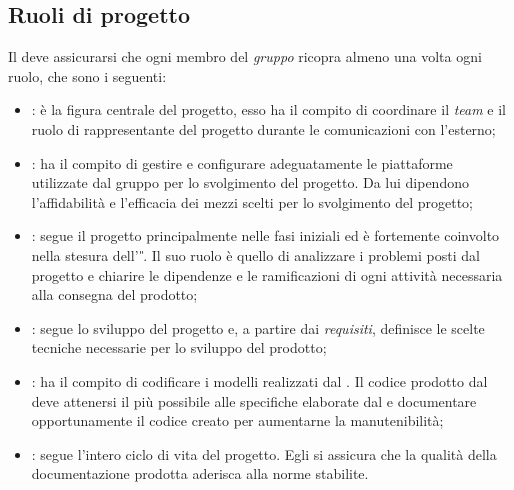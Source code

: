 \subsection{Ruoli di progetto} %
Il \RdP{} deve assicurarsi che ogni membro del \emph{gruppo} ricopra almeno una volta ogni ruolo, che sono i seguenti:
	\begin{itemize}
		\item \textbf{\RdP}: è la figura centrale del progetto, esso ha il compito di coordinare il \emph{team} e il ruolo di rappresentante del progetto durante le comunicazioni con l'esterno;
		\item \textbf{\Amm}: ha il compito di gestire e configurare adeguatamente le piattaforme utilizzate dal gruppo per lo svolgimento del progetto. Da lui dipendono l'affidabilità e l'efficacia dei mezzi scelti per lo svolgimento del progetto;
		\item \textbf{\Ana}: segue il progetto principalmente nelle fasi iniziali ed è fortemente coinvolto nella stesura dell' \AdR{}\textit{\G}. Il suo ruolo è quello di analizzare i problemi posti dal progetto e chiarire le dipendenze e le ramificazioni di ogni attività necessaria alla consegna del prodotto;
		\item \textbf{\Prog}: segue lo sviluppo del progetto e, a partire dai \emph{requisiti}, definisce le scelte tecniche necessarie per lo sviluppo del prodotto;
		\item \textbf{\Progm}: ha il compito di codificare i modelli realizzati dal \Prog{}. Il codice prodotto dal \Progm{} deve attenersi il più possibile alle specifiche elaborate dal \Prog{} e documentare opportunamente il codice creato per aumentarne la manutenibilità;
		\item \textbf{\Ver}: segue l'intero ciclo di vita del progetto. Egli si assicura che la qualità della documentazione prodotta aderisca alla norme stabilite.
	\end{itemize}

